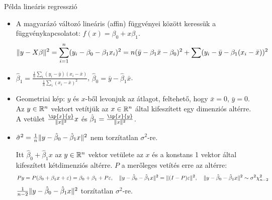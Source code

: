 \documentclass[aspectratio=169,notheorems,9pt,\option]{beamer}\usepackage[]{graphicx}\usepackage[]{color}
\begin{document}
\begin{frame}{Példa lineáris regresszió}
  \begin{itemize}
    \item A magyarázó változó lineáris (affin) függvényei között keressük a függvénykapcsolatot: 
    $f(x)=\beta_0+x\beta_1$.
    \begin{displaymath}
      \lVert y-X\beta\rVert^2
      =\sum_{i=1}^n (y_i-\beta_0-\beta_1 x_i)^2
      =n(\bar{y}-\beta_1\bar{x}-\beta_0)^2+ \sum (y_i-\bar{y}-\beta_1 (x_i-\bar{x}))^2
    \end{displaymath}
    \item $\hat\beta_1=\frac{\frac1n\sum_i (y_i-\bar{y})(x_i-\bar{x})}{\frac1n\sum_i (x_i-\bar{x})^2}$, 
    $\hat\beta_0=\bar{y}-\hat\beta_1\bar{x}$. 
    \item Geometriai kép: $y$ és $x$-ből levonjuk az átlagot, feltehető, hogy $\bar{x}=0$, $\bar{y}=0$. 
    Az $y\in\mathbb{R}^n$ vektort vetítjük az $x\in\mathbb{R}^n$ által kifeszített egy dimenziós altérre.
    A vetület $\frac{\ip{x}{y}}{\norm{x}^2} x$ és 
    $\hat\beta_1=\frac{\ip{x}{y}}{\norm{x}^2}$.
    \item $\hat\sigma^2=\frac1n\lVert y-\hat\beta_0-\hat\beta_1x\rVert^2$ nem torzítatlan $\sigma^2$-re. 
    
    Itt $\hat\beta_0+\hat\beta_1 x$ az $y\in\mathbb{R}^n$ vektor vetülete az 
    $x$ és a konstans 1 vektor által 
    kifeszített kétdimenziós altérre. $P$  a merőleges vetítés erre az altérre:
    \begin{displaymath}
      Py=P(\beta_0+\beta_1 x+\varepsilon)=\beta_0+\beta_1+P\varepsilon,\quad
      \lVert y-\hat\beta_0-\hat\beta_1x\rVert^2=\lVert(I-P)\varepsilon\rVert^2,\quad 
      \lVert y-\hat\beta_0-\hat\beta_1x\rVert^2\sim\sigma^2\chi^2_{n-2}
    \end{displaymath}
    $\frac1{n-2}\lVert y-\hat\beta_0-\hat\beta_1x\rVert^2$ torzítatlan $\sigma^2$-re.
  \end{itemize}
\end{frame}
\end{document}
